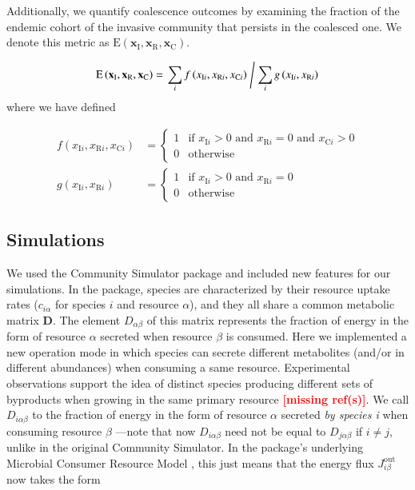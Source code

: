 \documentclass[a4paper,10pt]{article}
\newcommand{\mr}{\textcolor{red}{\textbf{[missing ref(s)]}}}
\begin{document}
Additionally, we quantify coalescence outcomes by examining the fraction of the endemic
cohort of the invasive community that persists in the coalesced one. We denote this
metric as
$\mathrm{E} \left( \mathbf{x}_\mathrm{I},
\mathbf{x}_\mathrm{R},
\mathbf{x}_\mathrm{C} \right)$.


\begin{equation}
\mathrm{E} \left( \mathbf{x}_\mathrm{I},
\mathbf{x}_\mathrm{R},
\mathbf{x}_\mathrm{C} \right) = 
\left.
\sum_i
f \left( x_{\mathrm{I}i}, x_{\mathrm{R}i}, x_{\mathrm{C}i} \right)
\;
\middle/
\;
\sum_i
g \left( x_{\mathrm{I}i}, x_{\mathrm{R}i} \right)
\right.
\label{eq:endemic}
\end{equation}
%
where we have defined

\begin{equation}
\begin{split}
f \left( x_{\mathrm{I}i}, x_{\mathrm{R}i}, x_{\mathrm{C}i} \right) & =
\begin{cases}
    1 & \text{if } x_{\mathrm{I}i} > 0 \text{ and }
                   x_{\mathrm{R}i} = 0 \text{ and }
                   x_{\mathrm{C}i} > 0 \\
    0 & \text{otherwise}
\end{cases} \\
g \left( x_{\mathrm{I}i}, x_{\mathrm{R}i} \right) & =
\begin{cases}
    1 & \text{if } x_{\mathrm{I}i} > 0 \text{ and }
                   x_{\mathrm{R}i} = 0 \\
    0 & \text{otherwise}
\end{cases}
\end{split}
\label{eq:endemic-f}
\end{equation}

\subsection*{Simulations}\label{methods:sim}

We used the Community Simulator package \cite{Marsland2020} and included new
features for our simulations. In the package,
species are characterized by their resource uptake rates ($c_{i\alpha}$ for
species $i$ and resource $\alpha$), and they all
share a common metabolic matrix $\mathbf{D}$.
The element $D_{\alpha\beta}$
of this matrix represents the fraction of energy in the form of resource $\alpha$
secreted when resource $\beta$ is consumed.
Here we implemented a new operation mode
in which species can secrete different metabolites (and/or
in different abundances) when consuming a same resource. Experimental observations
support the idea of distinct species producing different sets of byproducts when
growing in the same primary resource \mr. We call $D_{i\alpha\beta}$ to the
fraction of energy in the form of resource $\alpha$ secreted \textit{by species
i} when consuming resource $\beta$ ---note that now $D_{i\alpha\beta}$ need not be
equal to $D_{j\alpha\beta}$ if $i \neq j$, unlike in the original Community
Simulator. In the package's underlying Microbial Consumer Resource Model
\cite{Goldford2018,Marsland2019}, this just means that the energy flux
$J^{\mathrm{out}}_{i\beta}$ now takes the form
\end{document}
